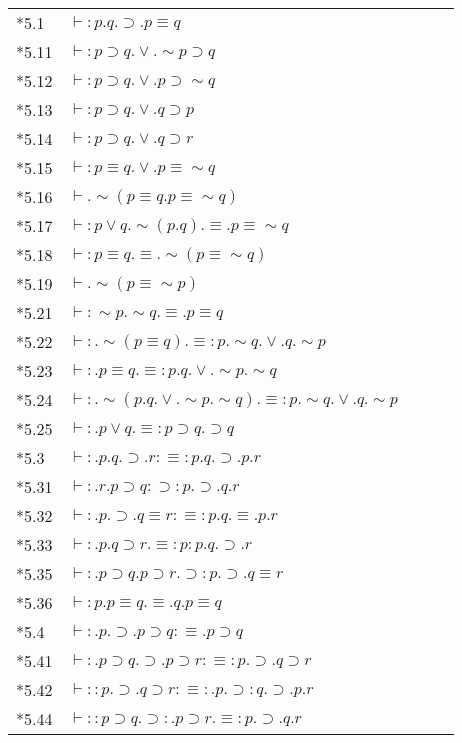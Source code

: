 \noindent\begin{tabular}[t]{l@{\quad}l@{\quad}l@{\quad}ll}
{*5.1} & $\vdash:p.q.\supset.p\equiv{q}$\\
{*5.11} & $\vdash:p\supset{q}.\vee.\sim{p}\supset{q}$\\
{*5.12} & $\vdash:p\supset{q}.\vee.p\supset\sim{q}$\\
{*5.13} & $\vdash:p\supset{q}.\vee.q\supset{p}$\\
{*5.14} & $\vdash:p\supset{q}.\vee.q\supset{r}$\\
{*5.15} & $\vdash:p\equiv{q}.\vee.p\equiv\sim{q}$\\
{*5.16} & $\vdash.\sim(p\equiv{q}.p\equiv\sim{q})$\\
{*5.17} & $\vdash:p\vee{q}.\sim(p.q).\equiv.p\equiv\sim{q}$\\
{*5.18} & $\vdash:p\equiv{q}.\equiv.\sim(p\equiv\sim{q})$\\
{*5.19} & $\vdash.\sim(p\equiv\sim{p})$\\
{*5.21} & $\vdash:\sim{p}.\sim{q}.\equiv.p\equiv{q}$\\
{*5.22} & $\vdash:.\sim(p\equiv{q}).\equiv:p.\sim{q}.\vee.q.\sim{p}$\\
{*5.23} & $\vdash:.p\equiv{q}.\equiv:p.q.\vee.\sim{p}.\sim{q}$\\
{*5.24} & $\vdash:.\sim(p.q.\vee.\sim{p}.\sim{q}).\equiv:p.\sim{q}.\vee.q.\sim{p}$\\
{*5.25} & $\vdash:.p\vee{q}.\equiv:p\supset{q}.\supset{q}$\\
{*5.3} & $\vdash:.p.q.\supset.r:\equiv:p.q.\supset.p.r$\\
{*5.31} & $\vdash:.r.p\supset{q}:\supset:p.\supset.q.r$\\
{*5.32} & $\vdash:.p.\supset.q\equiv{r}:\equiv:p.q.\equiv.p.r$\\
{*5.33} & $\vdash:.p.q\supset{r}.\equiv:p:p.q.\supset.r$\\
{*5.35} & $\vdash:.p\supset{q}.p\supset{r}.\supset:p.\supset.q\equiv{r}$\\
{*5.36} & $\vdash:p.p\equiv{q}.\equiv.q.p\equiv{q}$\\
{*5.4} & $\vdash:.p.\supset.p\supset{q}:\equiv.p\supset{q}$\\
{*5.41} & $\vdash:.p\supset{q}.\supset.p\supset{r}:\equiv:p.\supset.q\supset{r}$\\
{*5.42} & $\vdash::p.\supset.q\supset{r}:\equiv:.p.\supset:q.\supset.p.r$\\
{*5.44} & $\vdash::p\supset{q}.\supset:.p\supset{r}.\equiv:p.\supset.q.r$\\

\end{tabular}
